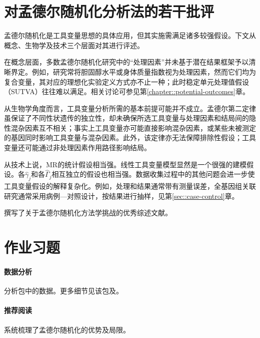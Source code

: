  
\section{对孟德尔随机化分析法的若干批评}




孟德尔随机化是工具变量思想的具体应用，但其实施需满足诸多较强假设。下文从概念、生物学及技术三个层面对其进行评述。 



在概念层面，多数孟德尔随机化研究中的“处理因素”并未基于潜在结果框架予以清晰界定。例如，研究常将胆固醇水平或身体质量指数视为处理因素，然而它们均为复合变量，其对应的理想化实验定义方式亦不止一种；此时稳定单元处理值假设（SUTVA）往往难以满足。相关讨论可参见第\ref{chapter::potential-outcomes}章。


从生物学角度而言，工具变量分析所需的基本前提可能并不成立。孟德尔第二定律虽保证了不同性状遗传的独立性，却未确保所选工具变量与处理因素和结局间的隐性混杂因素互不相关；事实上工具变量亦可能直接影响混杂因素，或某些未被测定的基因同时影响工具变量与混杂因素。此外，该定律亦无法保障排除性假设；工具变量还可能通过非处理因素作用路径影响结局。 


从技术上说，MR的统计假设相当强。线性工具变量模型显然是一个很强的建模假设。各$\hat\gamma_j$和各$\hat\Gamma_j$相互独立的假设也相当强。数据收集过程中的其他问题会进一步使工具变量假设的解释复杂化。例如，处理和结果通常带有测量误差，全基因组关联研究通常采用病例—对照设计，按结果进行抽样，见第\ref{sec::case-control}章。

 
\citet{vanderweele2014methodological}撰写了关于孟德尔随机化方法学挑战的优秀综述文献。 

 
 
\section{作业习题}

\paragraph{数据分析}\label{para::data-bmi-bmi}
分析包中的数据。更多细节见该包及\citet[][Section 7.2]{zhao2020statistical}。 


 
 \paragraph{推荐阅读}

\citet{davey2003mendelian}系统梳理了孟德尔随机化的优势及局限。 




